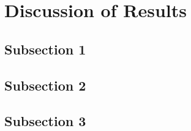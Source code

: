 \section{Discussion of Results}
\label{sec:DIS}

\subsection{Subsection 1}



\subsection{Subsection 2}



\subsection{Subsection 3}
